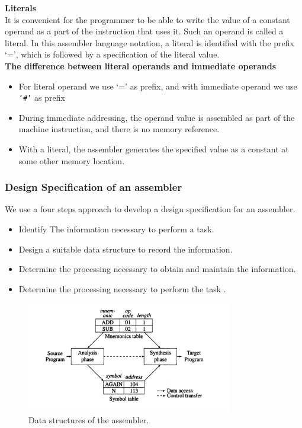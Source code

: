 \documentclass[12pt]{article}
\begin{document}
\textbf{Literals}\\
It is convenient for the programmer to be able to write the value of a constant operand as a part of the instruction that uses it. Such an operand is called a literal. In this assembler language notation, a literal is identified with the prefix ‘=’, which is followed by a specification of the literal value.\\
\textbf{The difference between literal operands and immediate operands}\\
\begin{itemize}
  \item For literal operand we use ‘=’ as prefix, and with immediate operand we use \verb|‘#’| as prefix
  \item During immediate addressing, the operand value is assembled as part of the machine instruction, and there is no memory reference.\item With a literal, the assembler generates the specified value as a constant at some other memory location.
\end{itemize}
\subsubsection{Design Specification of an assembler}
We use a four steps approach to develop a design specification for an assembler.
\begin{itemize}
\item Identify The information necessary to perform a task.\item Design a suitable data structure to record the information.\item Determine the processing necessary to obtain and maintain the information. \item Determine the processing necessary to perform the task . 
\end{itemize}

\begin{figure}[H]
\centering
\includegraphics[width=0.8\textwidth]{datas.png}
\caption{\label{fig:data_s}Data structures of the assembler.}
\end{figure}
\end{document}
